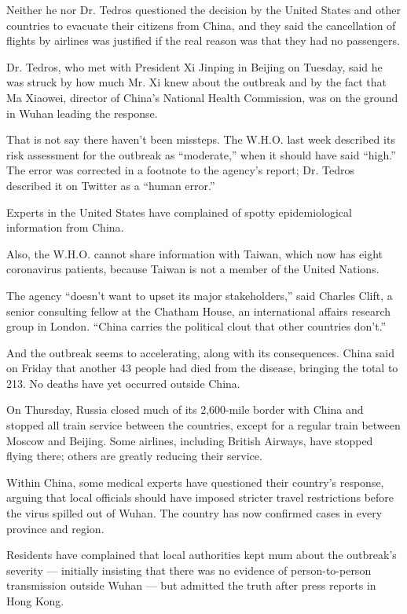 Neither he nor Dr. Tedros questioned the decision by the United States
and other countries to evacuate their citizens from China, and they said
the cancellation of flights by airlines was justified if the real reason
was that they had no passengers.

Dr. Tedros, who met with President Xi Jinping in Beijing on Tuesday,
said he was struck by how much Mr. Xi knew about the outbreak and by the
fact that Ma Xiaowei, director of China's National Health Commission,
was on the ground in Wuhan leading the response.

That is not say there haven't been missteps. The W.H.O. last week
described its risk assessment for the outbreak as ``moderate,'' when it
should have said ``high.'' The error was corrected in a footnote to the
agency's report; Dr. Tedros described it on Twitter as a ``human
error.''

Experts in the United States have complained of spotty epidemiological
information from China.

Also, the W.H.O. cannot share information with Taiwan, which now has
eight coronavirus patients, because Taiwan is not a member of the United
Nations.

The agency ``doesn't want to upset its major stakeholders,'' said
Charles Clift, a senior consulting fellow at the Chatham House, an
international affairs research group in London. ``China carries the
political clout that other countries don't.''

And the outbreak seems to accelerating, along with its consequences.
China said on Friday that another 43 people had died from the disease,
bringing the total to 213. No deaths have yet occurred outside China.

On Thursday, Russia closed much of its 2,600-mile border with China and
stopped all train service between the countries, except for a regular
train between Moscow and Beijing. Some airlines, including British
Airways, have stopped flying there; others are greatly reducing their
service.

Within China, some medical experts have questioned their country's
response, arguing that local officials should have imposed stricter
travel restrictions before the virus spilled out of Wuhan. The country
has now confirmed cases in every province and region.

Residents have complained that local authorities kept mum about the
outbreak's severity --- initially insisting that there was no evidence
of person-to-person transmission outside Wuhan --- but admitted the
truth after press reports in Hong Kong.

